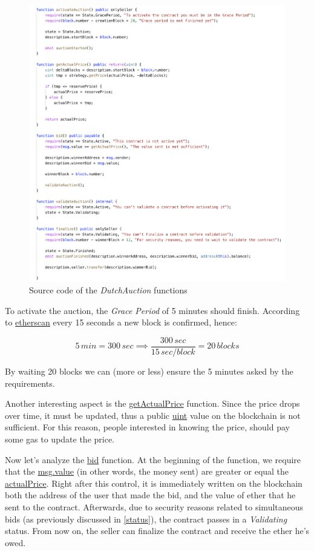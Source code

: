 \documentclass[runningheads,a4paper]{llncs}
\begin{document}
\begin{figure}[h]
\includegraphics[width=\linewidth]{images/DutchCode.png}
\centering
\caption{Source code of the \emph{DutchAuction} functions}
\label{fig:DutchCode}
\end{figure}

To activate the auction, the \emph{Grace Period} of 5 minutes should finish. According to \url{etherscan}\cite{etherscan} every 15 seconds a new block is confirmed, hence:


\[5 \, min = 300 \, sec \implies \frac{300 \, sec}{15 \, sec/block}  = 20 \, blocks\]

By waiting 20 blocks we can (more or less) ensure the 5 minutes asked by the requirements.

Another interesting aspect is the \url{getActualPrice} function. Since the price drops over time, it must be updated, thus a public \url{uint} value on the blockchain is not sufficient. For this reason, people interested in knowing the price, should pay some gas to update the price. 

Now let's analyze the \url{bid} function. At the beginning of the function, we require that the \url{msg.value} (in other words, the money sent) are greater or equal the \url{actualPrice}. Right after this control, it is immediately written on the blockchain both the address of the user that made the bid, and the value of ether that he sent to the contract. Afterwards, due to security reasons related to simultaneous bids (as previously discussed in \ref{status}), the contract passes in a \emph{Validating} status. From now on, the seller can finalize the contract and receive the ether he's owed. 
\end{document}

